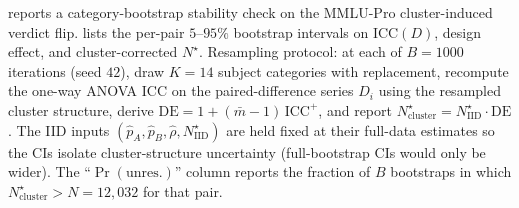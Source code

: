 \documentclass{article}
\theoremstyle{plain}
\theoremstyle{definition}
\begin{document}
 reports a category-bootstrap stability check on the MMLU-Pro cluster-induced verdict flip.  lists the per-pair $5$--$95\%$ bootstrap intervals on $\mathrm{ICC}(D)$, design effect, and cluster-corrected $N^{\star}$. Resampling protocol: at each of $B{=}1000$ iterations (seed $42$), draw $K{=}14$ subject categories with replacement, recompute the one-way ANOVA $\mathrm{ICC}$ on the paired-difference series $D_i$ using the resampled cluster structure, derive $\mathrm{DE} = 1 + (\bar m - 1)\,\mathrm{ICC}^+$, and report $N^{\star}_{\mathrm{cluster}} = N^{\star}_{\mathrm{IID}}\cdot\mathrm{DE}$. The IID inputs $(\hat p_A,\hat p_B,\hat\rho,N^{\star}_{\mathrm{IID}})$ are held fixed at their full-data estimates so the CIs isolate cluster-structure uncertainty (full-bootstrap CIs would only be wider). The ``$\Pr(\text{unres.})$'' column reports the fraction of $B$ bootstraps in which $N^{\star}_{\mathrm{cluster}} > N{=}12{,}032$ for that pair.
\end{document}

